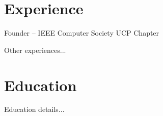 \documentclass{article}
\begin{document}
\section*{Experience}
Founder -- IEEE Computer Society UCP Chapter
\par
Other experiences...
\section*{Education}
Education details...
\end{document}
